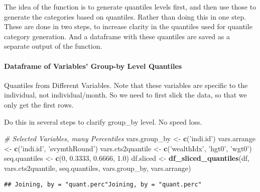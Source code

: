 \documentclass[
]{book}
\newenvironment{Shaded}{\begin{snugshade}}{\end{snugshade}}
\newcommand{\CommentTok}[1]{\textcolor[rgb]{0.56,0.35,0.01}{\textit{#1}}}
\newcommand{\DecValTok}[1]{\textcolor[rgb]{0.00,0.00,0.81}{#1}}
\newcommand{\FloatTok}[1]{\textcolor[rgb]{0.00,0.00,0.81}{#1}}
\newcommand{\KeywordTok}[1]{\textcolor[rgb]{0.13,0.29,0.53}{\textbf{#1}}}
\newcommand{\NormalTok}[1]{#1}
\newcommand{\OperatorTok}[1]{\textcolor[rgb]{0.81,0.36,0.00}{\textbf{#1}}}
\newcommand{\StringTok}[1]{\textcolor[rgb]{0.31,0.60,0.02}{#1}}
\begin{document}
The idea of the function is to generate quantiles levels first, and then use those to generate the categories based on quantiles. Rather than doing this in one step. These are done in two steps, to increase clarity in the quantiles used for quantile category generation. And a dataframe with these quantiles are saved as a separate output of the function.

\hypertarget{dataframe-of-variables-group-by-level-quantiles}{%
\paragraph{Dataframe of Variables' Group-by Level Quantiles}\label{dataframe-of-variables-group-by-level-quantiles}}

Quantiles from Different Variables. Note that these variables are specific to the individual, not individual/month. So we need to first slick the data, so that we only get the first rows.

Do this in several steps to clarify group\_by level. No speed loss.

\begin{Shaded}
\begin{Highlighting}[]
\CommentTok{# Selected Variables, many Percentiles}
\NormalTok{vars.group_by <-}\StringTok{ }\KeywordTok{c}\NormalTok{(}\StringTok{'indi.id'}\NormalTok{)}
\NormalTok{vars.arrange <-}\StringTok{ }\KeywordTok{c}\NormalTok{(}\StringTok{'indi.id'}\NormalTok{, }\StringTok{'svymthRound'}\NormalTok{)}
\NormalTok{vars.cts2quantile <-}\StringTok{ }\KeywordTok{c}\NormalTok{(}\StringTok{'wealthIdx'}\NormalTok{, }\StringTok{'hgt0'}\NormalTok{, }\StringTok{'wgt0'}\NormalTok{)}
\NormalTok{seq.quantiles <-}\StringTok{ }\KeywordTok{c}\NormalTok{(}\DecValTok{0}\NormalTok{, }\FloatTok{0.3333}\NormalTok{, }\FloatTok{0.6666}\NormalTok{, }\FloatTok{1.0}\NormalTok{)}
\NormalTok{df.sliced <-}\StringTok{ }\KeywordTok{df_sliced_quantiles}\NormalTok{(df, vars.cts2quantile, seq.quantiles, vars.group_by, vars.arrange)}
\end{Highlighting}
\end{Shaded}

\begin{verbatim}
## Joining, by = "quant.perc"Joining, by = "quant.perc"
\end{verbatim}

\begin{Shaded}
\end{Shaded}
\end{document}
